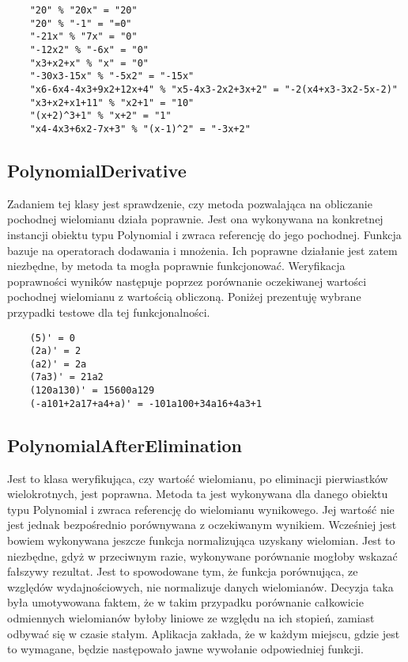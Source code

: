\documentclass[oneside,a4paper]{book}
\begin{document}
	\begin{lstlisting}
	"20" % "20x" = "20"
	"20" % "-1" = "=0"
	"-21x" % "7x" = "0"
	"-12x2" % "-6x" = "0"
	"x3+x2+x" % "x" = "0"
	"-30x3-15x" % "-5x2" = "-15x"
	"x6-6x4-4x3+9x2+12x+4" % "x5-4x3-2x2+3x+2" = "-2(x4+x3-3x2-5x-2)"
	"x3+x2+x1+11" % "x2+1" = "10"
	"(x+2)^3+1" % "x+2" = "1"
	"x4-4x3+6x2-7x+3" % "(x-1)^2" = "-3x+2"
	\end{lstlisting}
	
	\subsection{PolynomialDerivative}
	
	Zadaniem tej klasy jest sprawdzenie, czy metoda pozwalająca na obliczanie pochodnej wielomianu działa poprawnie. Jest ona wykonywana na konkretnej instancji obiektu typu Polynomial i zwraca referencję do jego pochodnej. Funkcja bazuje na operatorach dodawania i mnożenia. Ich poprawne działanie jest zatem niezbędne, by metoda ta mogła poprawnie funkcjonować.
	Weryfikacja poprawności wyników następuje poprzez porównanie oczekiwanej wartości pochodnej wielomianu z wartością obliczoną. Poniżej prezentuję wybrane przypadki testowe dla tej funkcjonalności.
	
	\begin{lstlisting}
	(5)' = 0
	(2a)' = 2
	(a2)' = 2a
	(7a3)' = 21a2
	(120a130)' = 15600a129
	(-a101+2a17+a4+a)' = -101a100+34a16+4a3+1
	\end{lstlisting}
	
	\subsection{PolynomialAfterElimination}
	
	Jest to klasa weryfikująca, czy wartość wielomianu, po eliminacji pierwiastków wielokrotnych, jest poprawna. Metoda ta jest wykonywana dla danego obiektu typu Polynomial i zwraca referencję do wielomianu wynikowego. Jej wartość nie jest jednak bezpośrednio porównywana z oczekiwanym wynikiem. Wcześniej jest bowiem wykonywana jeszcze funkcja normalizująca uzyskany wielomian. Jest to niezbędne, gdyż w przeciwnym razie, wykonywane porównanie mogłoby wskazać fałszywy rezultat. Jest to spowodowane tym, że funkcja porównująca, ze względów wydajnościowych, nie normalizuje danych wielomianów. Decyzja taka była umotywowana faktem, że w takim przypadku porównanie całkowicie odmiennych wielomianów byłoby liniowe ze względu na ich stopień, zamiast odbywać się w czasie stałym. Aplikacja zakłada, że w każdym miejscu, gdzie jest to wymagane, będzie następowało jawne wywołanie odpowiedniej funkcji.
	
\end{document}
